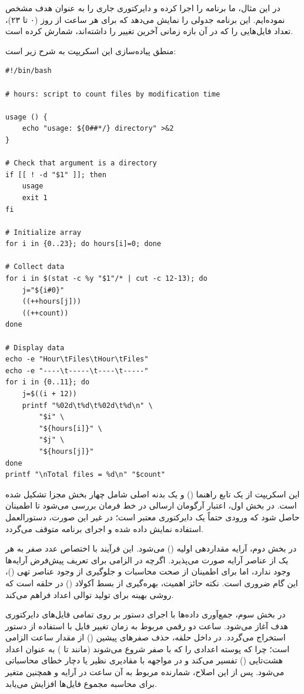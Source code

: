 در این مثال، ما برنامه  را اجرا کرده و دایرکتوری جاری را به عنوان هدف مشخص نموده‌ایم. این برنامه جدولی را نمایش می‌دهد که برای هر ساعت از روز (۰ تا ۲۳)، تعداد فایل‌هایی را که در آن بازه زمانی آخرین تغییر را داشته‌اند، شمارش کرده است.

منطق پیاده‌سازی این اسکریپت به شرح زیر است:

\begin{latin}
\begin{lstlisting}
#!/bin/bash

# hours: script to count files by modification time

usage () {
    echo "usage: ${0##*/} directory" >&2
}

# Check that argument is a directory
if [[ ! -d "$1" ]]; then
    usage
    exit 1
fi

# Initialize array
for i in {0..23}; do hours[i]=0; done

# Collect data
for i in $(stat -c %y "$1"/* | cut -c 12-13); do
    j="${i#0}"
    ((++hours[j]))
    ((++count))
done

# Display data
echo -e "Hour\tFiles\tHour\tFiles"
echo -e "----\t-----\t----\t-----"
for i in {0..11}; do
    j=$((i + 12))
    printf "%02d\t%d\t%02d\t%d\n" \
        "$i" \
        "${hours[i]}" \
        "$j" \
        "${hours[j]}"
done
printf "\nTotal files = %d\n" "$count"
\end{lstlisting}
\end{latin}

این اسکریپت از یک تابع راهنما () و یک بدنه اصلی شامل چهار بخش مجزا تشکیل شده است. در بخش اول، اعتبار آرگومان ارسالی در خط فرمان بررسی می‌شود تا اطمینان حاصل شود که ورودی حتماً یک دایرکتوری معتبر است؛ در غیر این صورت، دستورالعمل استفاده نمایش داده شده و اجرای برنامه متوقف می‌گردد.

در بخش دوم، آرایه  مقداردهی اولیه () می‌شود. این فرآیند با اختصاص عدد صفر به هر یک از عناصر آرایه صورت می‌پذیرد. اگرچه در  الزامی برای تعریف پیش‌فرض آرایه‌ها وجود ندارد، اما برای اطمینان از صحت محاسبات و جلوگیری از وجود عناصر تهی ()، این گام ضروری است. نکته حائز اهمیت، بهره‌گیری از بسط آکولاد () در حلقه  است که روشی بهینه برای تولید توالی اعداد فراهم می‌کند.

در بخش سوم، جمع‌آوری داده‌ها با اجرای دستور  بر روی تمامی فایل‌های دایرکتوری هدف آغاز می‌شود. ساعت دو رقمی مربوط به زمان تغییر فایل با استفاده از دستور  استخراج می‌گردد. در داخل حلقه، حذف صفرهای پیشین () از مقدار ساعت الزامی است؛ چرا که پوسته  اعدادی را که با صفر شروع می‌شوند (مانند  تا ) به عنوان اعداد هشت‌تایی () تفسیر می‌کند و در مواجهه با مقادیری نظیر  یا  دچار خطای محاسباتی می‌شود. پس از این اصلاح، شمارنده مربوط به آن ساعت در آرایه و همچنین متغیر  برای محاسبه مجموع فایل‌ها افزایش می‌یابد.

